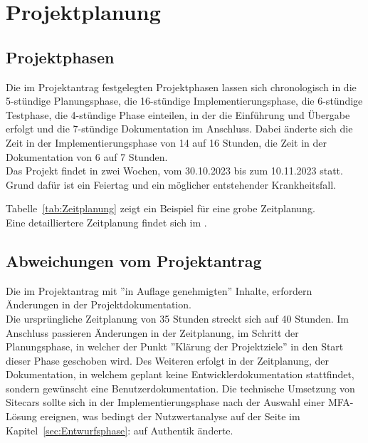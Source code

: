 \section{Projektplanung} 
\label{sec:Projektplanung}


\subsection{Projektphasen}
\label{sec:Projektphasen}
Die im Projektantrag festgelegten Projektphasen lassen sich chronologisch in die 5-stündige Planungsphase, 
die 16-stündige Implementierungsphase, die 6-stündige Testphase, die 4-stündige Phase einteilen, in der die 
Einführung und Übergabe erfolgt und die 7-stündige Dokumentation im Anschluss.
Dabei änderte sich die Zeit in der Implementierungsphase von 14 auf 16 Stunden, die Zeit in der 
Dokumentation von 6 auf 7 Stunden.
\\Das Projekt findet in zwei Wochen, vom 30.10.2023 bis zum 10.11.2023 statt. Grund dafür ist ein Feiertag 
und ein möglicher entstehender Krankheitsfall.

Tabelle~\ref{tab:Zeitplanung} zeigt ein Beispiel für eine grobe Zeitplanung.
\\
Eine detailliertere Zeitplanung findet sich im .


\subsection{Abweichungen vom Projektantrag}
\label{sec:AbweichungenProjektantrag}

Die im Projektantrag mit ''in Auflage genehmigten'' Inhalte, erfordern Änderungen in der Projektdokumentation. 
\\Die ursprüngliche Zeitplanung von 35 Stunden streckt sich auf 40 Stunden.
Im Anschluss passieren Änderungen in der Zeitplanung, im Schritt der Planungsphase, in welcher der Punkt ''Klärung der 
Projektziele'' in den Start dieser Phase geschoben wird. Des Weiteren erfolgt in der Zeitplanung, der 
Dokumentation, in welchem geplant keine Entwicklerdokumentation stattfindet, sondern gewünscht eine 
Benutzerdokumentation. Die technische Umsetzung von Sitecars sollte sich in der Implementierungsphase 
nach der Auswahl einer MFA-Lösung ereignen, was bedingt der Nutzwertanalyse auf der Seite 
\pageref{sec:Authentifizierungs-Tool} im Kapitel~\ref{sec:Entwurfsphase}:  
auf Authentik änderte.


